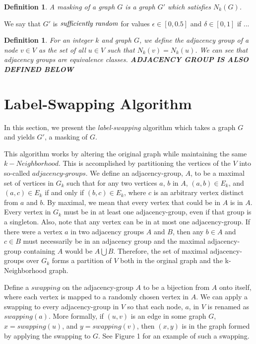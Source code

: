 \documentclass[11pt]{article}
\newtheorem{definition}[thm]{Definition}
\begin{document}
\begin{definition}
A \emph{masking} of a graph $G$ is a graph $G'$ which satisfies $N_k(G)$.\\
\end{definition}

\noindent We say that $G'$ is $\emph{sufficiently random}$ for values $\epsilon \in [0, 0.5 ]$ and $\delta \in [0,1]$ if ...



\begin{definition}
For an integer $k$ and graph $G$, we define the \emph{adjacency group} of a node $v \in V$ as the set of all $u \in V$ such that $N_k(v) = N_k(u)$. We can see that adjacency groups are equivalence classes. {\bf ADJACENCY GROUP IS ALSO DEFINED BELOW}
\end{definition}

\section{Label-Swapping Algorithm}
\indent In this section, we present the \emph{label-swapping} algorithm which takes a graph $G$ and yields $G'$, a masking of $G$.

\noindent This algorithm works by altering the original graph while maintaining the same $k-Neighborhood$. This is accomplished by partitioning the vertices of the $V$ into so-called $adjacency$-$groups$.  We define an adjacency-group, $A$, to be a maximal set of vertices in $G_k$ such that for any two vertices $a$, $b$ in $A$, $(a, b) \in E_k$, and $(a, c) \in E_k$  if and only if $(b, c) \in E_k$, where $c$ is an arbitrary vertex distinct from $a$ and $b$. By maximal, we mean that every vertex that could be in $A$ is in $A$. Every vertex in $G_k$ must be in at least one adjacency-group, even if that group is a singleton. Also, note that any vertex can be in at most one adjacency-group. If there were a vertex $a$ in two adjacency groups $A$ and $B$, then any $b \in A$ and $c \in B$ must necessarily be in an adjacency group and the maximal adjacency-group containing $A$ would be $A \bigcup B$. Therefore, the set of maximal adjacency-groups over $G_k$ forms a partition of $V$ both in the orginal graph and the k-Neighborhood graph. 


\indent Define a $swapping$ on the adjacency-group $A$ to be a bijection from $A$ onto itself, where each vertex is mapped to a randomly chosen vertex in $A$. We can apply a swapping to every adjacency-group in $V$ so that each node, $a$, in $V$ is renamed as $swapping(a)$. More formally, if $(u,v)$ is an edge in some graph $G$, $x=swapping(u)$, and $y=swapping(v)$, then $(x,y)$ is in the graph formed by applying the swapping to $G$. See Figure 1 for an example of such a swapping.\\
\end{document}
